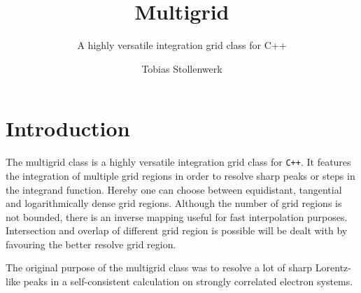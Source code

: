 \documentclass[a4paper]{scrreprt}
\begin{document}
\title{Multigrid}
\subtitle{A highly versatile integration grid class for C++}
\author{Tobias Stollenwerk}
\maketitle

\tableofcontents


\chapter{Introduction}

The multigrid class is a highly versatile integration grid class for \texttt{C++}. It features the integration of multiple grid regions in order to resolve sharp peaks or steps in the integrand function. Hereby one can choose between equidistant, tangential and logarithmically dense grid regions. Although the number of grid regions is not bounded, there is an inverse mapping useful for fast interpolation purposes. Intersection and overlap of different grid region is possible will be dealt with by favouring the better resolve grid region.

The original purpose of the multigrid class was to resolve a lot of sharp Lorentz-like peaks in a self-consistent calculation on strongly correlated electron systems.

\end{document}
